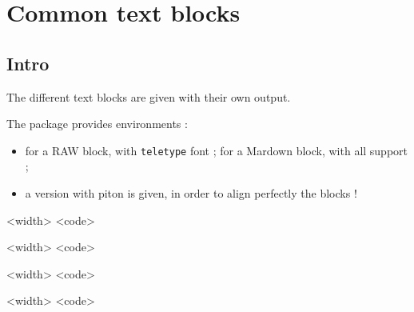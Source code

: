 \documentclass[english,11pt,a4paper]{article}
\begin{document}
\pagebreak

\section{Common text blocks}

\subsection{Intro}

The different text blocks are given with their own output.

The package provides environments :

\begin{itemize}
	\item for a \textsf{RAW} block, with \texttt{teletype} font ; for a \textsf{Mardown} block, with all  support ;
	\item a version with \textsf{piton} is given, in order to align perfectly the blocks !
\end{itemize}

\begin{codehigh}[language=latex/latex2,style/main=cyan!10,style/code=cyan!10]
\begin{NotebookRaw}{<width>}
<code>
\end{NotebookRaw}
\end{codehigh}

\begin{codehigh}[language=latex/latex2,style/main=cyan!10,style/code=cyan!10]
\begin{NotebookMarkdown}{<width>}
<code>
\end{NotebookMarkdown}
\end{codehigh}

\begin{codehigh}[language=latex/latex2,style/main=cyan!10,style/code=cyan!10]
\begin{NotebookPitonRaw}{<width>}
<code>
\end{NotebookPitonRaw}
\end{codehigh}

\begin{codehigh}[language=latex/latex2,style/main=cyan!10,style/code=cyan!10]
\begin{NotebookPitonMarkdown}{<width>}
<code>
\end{NotebookPitonMarkdown}
\end{codehigh}
\end{document}
